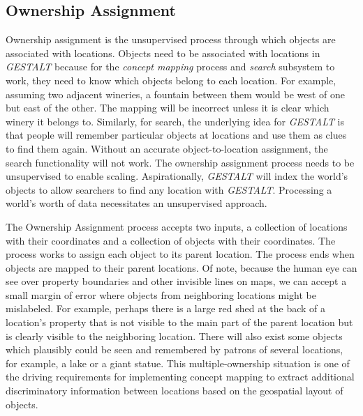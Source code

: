 \subsection{Ownership Assignment}
Ownership assignment is the unsupervised process through which objects are associated with locations. 
Objects need to be associated with locations in \textit{GESTALT} because for the \textit{concept mapping} process and \textit{search} subsystem to work, they need to know which objects belong to each location.
For example, assuming two adjacent wineries, a fountain between them would be west of one but east of the other. The mapping will be incorrect unless it is clear which winery it belongs to. 
Similarly, for search, the underlying idea for \textit{GESTALT} is that people will remember particular objects at locations and use them as clues to find them again. Without an accurate object-to-location assignment, the search functionality will not work. 
The ownership assignment process needs to be unsupervised to enable scaling. Aspirationally, \textit{GESTALT} will index the world's objects to allow searchers to find any location with \textit{GESTALT}. Processing a world's worth of data necessitates an unsupervised approach. 

The Ownership Assignment process accepts two inputs, a collection of locations with their coordinates and a collection of objects with their coordinates. 
The process works to assign each object to its parent location. 
The process ends when objects are mapped to their parent locations. Of note, because the human eye can see over property boundaries and other invisible lines on maps, we can accept a small margin of error where objects from neighboring locations might be mislabeled. For example, perhaps there is a large red shed at the back of a location's property that is not visible to the main part of the parent location but is clearly visible to the neighboring location.
There will also exist some objects which plausibly could be seen and remembered by patrons of several locations, for example, a lake or a giant statue. 
This multiple-ownership situation is one of the driving requirements for implementing concept mapping to extract additional discriminatory information between locations based on the geospatial layout of objects. 

